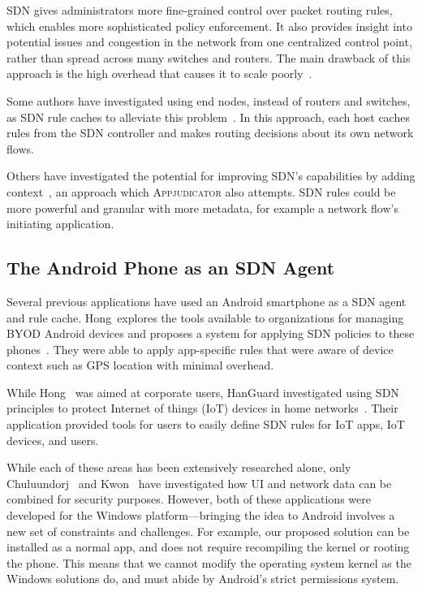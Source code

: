 SDN gives administrators more fine-grained control over packet routing rules,
which enables more sophisticated policy enforcement. It also provides insight
into potential issues and congestion in the network from one centralized control
point, rather than spread across many switches and routers. The main drawback of
this approach is the high overhead that causes it to scale
poorly~\cite{benzekki2016}.

Some authors have investigated using end nodes, instead of routers and switches,
as SDN rule caches to alleviate this problem~\cite{taylor2017, chuluundorj2019}.
In this approach, each host caches rules from the SDN controller and makes
routing decisions about its own network flows.

Others have investigated the potential for improving SDN's capabilities by
adding context~\cite{yang2015}, an approach which \textsc{Appjudicator} also
attempts. SDN rules could be more powerful and granular with more metadata, for
example a network flow's initiating application.

\subsection{The Android Phone as an SDN Agent}
\label{sec:the-android-phone-as-an-sdn-agent}

Several previous applications have used an Android smartphone as a SDN agent and
rule cache. Hong~\etal explores the tools available to organizations for
managing BYOD Android devices and proposes a system for applying SDN policies to
these phones~\cite{hong2016}. They were able to apply app-specific rules that
were aware of device context such as GPS location with minimal overhead.

While Hong~\etal \cite{hong2016} was aimed at corporate users, HanGuard
investigated using SDN principles to protect Internet of things (IoT) devices in
home networks~\cite{demetriou2017}. Their application provided tools for users
to easily define SDN rules for IoT apps, IoT devices, and users.

While each of these areas has been extensively researched alone, only
Chuluundorj~\cite{chuluundorj2019} and Kwon~\etal \cite{kwon2011} have
investigated how UI and network data can be combined for security purposes.
However, both of these applications were developed for the Windows
platform---bringing the idea to Android involves a new set of constraints and
challenges. For example, our proposed solution can be installed as a normal app,
and does not require recompiling the kernel or rooting the phone. This means
that we cannot modify the operating system kernel as the Windows solutions do,
and must abide by Android's strict permissions system.

\newpage
